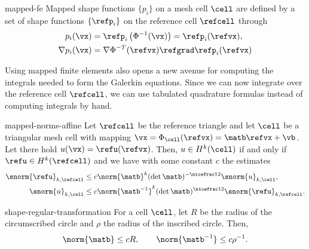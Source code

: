 \begin{Definition}{mapped-fe}
  Mapped shape functions $\{p_i\}$ on a mesh cell $\cell$ are defined by a
  set of shape functions $\{\refp_i\}$ on the reference cell
  $\refcell$ through 
  \begin{gather}
    \begin{split}
      p_i(\vx) &= \refp_i\left(\Phi^{-1}(\vx)\right) = \refp_i(\refvx),\\
      \nabla p_i(\vx) &= \nabla\Phi^{-T}(\refvx)\refgrad\refp_i(\refvx)
    \end{split}
  \end{gather}
\end{Definition}

\begin{remark}
  Using mapped finite elements also opens a new avenue for computing
  the integrals needed to form the Galerkin equations. Since we can
  now integrate over the reference cell $\refcell$, we can use
  tabulated quadrature formulas instead of computing integrals by
  hand.
\end{remark}


\begin{Lemma}{mapped-norms-affine}
  Let $\refcell$ be the reference triangle and let $\cell$ be a
  triangular mesh cell with mapping
  $\vx = \Phi_\cell(\refvx) = \matb \refvx + \vb$. Let there hold
  $u(\vx) = \refu(\refvx)$. Then, $u\in H^k(\cell)$ if and only if
  $\refu\in H^k(\refcell)$ and we have with some constant $c$ the
  estimates
  \begin{gather}
    \begin{split}
      \snorm{\refu}_{k,\refcell}
      &\le c \norm{\matb}^k (\det \matb)^{-\nicefrac12}
      \snorm{u}_{k,\cell},\\
      \snorm{u}_{k,\cell}
      &\le c \norm{\matb^{-1}}^k (\det \matb)^{\nicefrac12}
      \snorm{\refu}_{k,\refcell}.
    \end{split}
  \end{gather}
\end{Lemma}

\begin{Lemma}{shape-regular-transformation}
  For a cell $\cell$, let $R$ be the radius of the circumscribed
  circle and $\rho$ the radius of the inscribed circle. Then,
  \begin{gather}
    \norm{\matb} \le c R, \qquad \norm{\matb^{-1}} \le c \rho^{-1}.
  \end{gather}
\end{Lemma}

